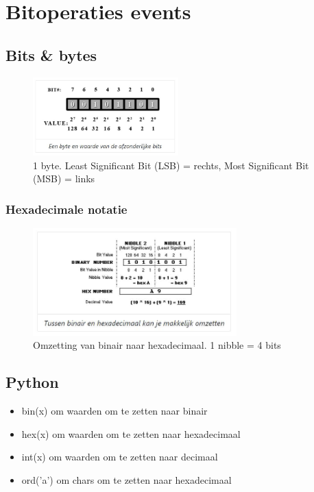 \documentclass{article}
\begin{document}
\section{Bitoperaties events}
\subsection{Bits \& bytes}
\begin{figure}[H]
    \centering
    \includegraphics[width=0.5\textwidth]{bits.png}
    \caption{1 byte. Least Significant Bit (LSB) = rechts, Most Significant Bit (MSB) = links}
\end{figure}

\subsubsection{Hexadecimale notatie}
\begin{figure}[H]
    \centering
    \includegraphics[width=0.7\textwidth]{hexa.png}
    \caption{Omzetting van binair naar hexadecimaal. 1 nibble = 4 bits}
\end{figure}

\subsection{Python}
\begin{itemize}
    \item bin(x) om waarden om te zetten naar binair
    \item hex(x) om waarden om te zetten naar hexadecimaal
    \item int(x) om waarden om te zetten naar decimaal
    \item ord('a') om chars om te zetten naar hexadecimaal
\end{itemize}
\end{document}
